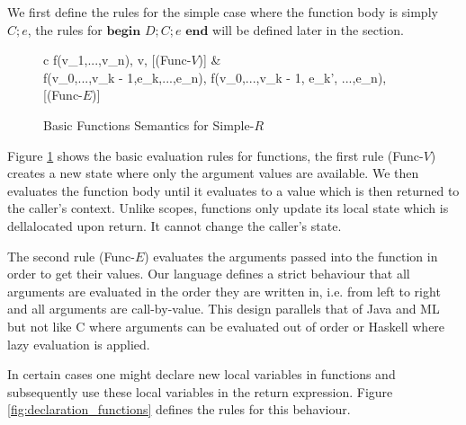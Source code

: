 \documentclass[a4paper,12pt]{report}
\begin{document}
\par
We first define the rules for the simple case where the function body is simply 
$C;e$, the rules for $\textbf{begin }D;C;e\textbf{ end}$ will be defined later 
in the section. 
\begin{figure}[H]
  \begin{center}
    \begin{tabular} {c}
      {\langle f(v_1,\text{ }...\text{ },v_n), \sigma \rangle \Longrightarrow \langle v, \sigma \rangle} [(Func-$V$)]
      & \\
      {\langle f(v_0,\text{ }...\text{ },v_{k - 1},e_k,\text{ }...\text{ },e_n), 
      \sigma \rangle \Longrightarrow \langle f(v_0,\text{ }...\text{ },v_{k - 1}, e_{k}',
      \text{ }...\text{ },e_n), \sigma \rangle} [(Func-$E$)]
    \end{tabular}
  \end{center}
  \caption{Basic Functions Semantics for Simple-$R$}
  \label{fig:basic_functions}
\end{figure}

\par
Figure \ref{fig:basic_functions} shows the basic evaluation rules for functions,  
the first rule (Func-$V$) creates a new state where only 
the argument values are available. We then evaluates the function body until it 
evaluates to a value which is then returned to the caller's context. Unlike 
scopes, functions only update its local state which is dellalocated upon return. 
It cannot change the caller's state. 

\par
The second rule (Func-$E$) evaluates the arguments passed into the 
function in order to get their values. Our language defines a strict 
behaviour that all arguments are evaluated in the order they are written in, 
i.e. from left to right and all arguments are call-by-value. This design parallels 
that of Java and ML but not like C where arguments can be evaluated out of order 
or Haskell where lazy evaluation is applied. 

\par
In certain cases one might declare new local variables in functions and 
subsequently use these local variables in the return expression. Figure 
\ref{fig:declaration_functions} defines the rules for this behaviour. 
\end{document}

